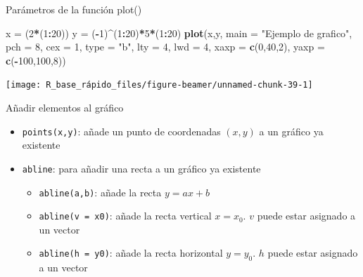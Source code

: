 \documentclass[
  ignorenonframetext,
  aspectratio=169]{beamer}
\newenvironment{Shaded}{\begin{snugshade}}{\end{snugshade}}
\newcommand{\AttributeTok}[1]{\textcolor[rgb]{0.13,0.29,0.53}{#1}}
\newcommand{\DecValTok}[1]{\textcolor[rgb]{0.00,0.00,0.81}{#1}}
\newcommand{\FunctionTok}[1]{\textcolor[rgb]{0.13,0.29,0.53}{\textbf{#1}}}
\newcommand{\NormalTok}[1]{#1}
\newcommand{\OtherTok}[1]{\textcolor[rgb]{0.56,0.35,0.01}{#1}}
\newcommand{\SpecialCharTok}[1]{\textcolor[rgb]{0.81,0.36,0.00}{\textbf{#1}}}
\newcommand{\StringTok}[1]{\textcolor[rgb]{0.31,0.60,0.02}{#1}}
\providecommand{\tightlist}{%
  \setlength{\itemsep}{0pt}\setlength{\parskip}{0pt}}
\begin{document}
\begin{frame}[fragile]{Parámetros de la función plot()}
\label{paruxe1metros-de-la-funciuxf3n-plot-3}
\begin{Shaded}
\begin{Highlighting}[]
\NormalTok{x }\OtherTok{=}\NormalTok{ (}\DecValTok{2}\SpecialCharTok{*}\NormalTok{(}\DecValTok{1}\SpecialCharTok{:}\DecValTok{20}\NormalTok{))}
\NormalTok{y }\OtherTok{=}\NormalTok{ (}\SpecialCharTok{{-}}\DecValTok{1}\NormalTok{)}\SpecialCharTok{\^{}}\NormalTok{(}\DecValTok{1}\SpecialCharTok{:}\DecValTok{20}\NormalTok{)}\SpecialCharTok{*}\DecValTok{5}\SpecialCharTok{*}\NormalTok{(}\DecValTok{1}\SpecialCharTok{:}\DecValTok{20}\NormalTok{)}
\FunctionTok{plot}\NormalTok{(x,y, }\AttributeTok{main =} \StringTok{"Ejemplo de grafico"}\NormalTok{, }\AttributeTok{pch =} \DecValTok{8}\NormalTok{, }\AttributeTok{cex =} \DecValTok{1}\NormalTok{,}
     \AttributeTok{type =} \StringTok{"b"}\NormalTok{, }\AttributeTok{lty =} \DecValTok{4}\NormalTok{, }\AttributeTok{lwd =} \DecValTok{4}\NormalTok{, }
     \AttributeTok{xaxp =} \FunctionTok{c}\NormalTok{(}\DecValTok{0}\NormalTok{,}\DecValTok{40}\NormalTok{,}\DecValTok{2}\NormalTok{), }\AttributeTok{yaxp =} \FunctionTok{c}\NormalTok{(}\SpecialCharTok{{-}}\DecValTok{100}\NormalTok{,}\DecValTok{100}\NormalTok{,}\DecValTok{8}\NormalTok{))}
\end{Highlighting}
\end{Shaded}

\begin{center}\texttt{[image: R\_base\_rápido\_files/figure-beamer/unnamed-chunk-39-1]} \end{center}
\end{frame}

\begin{frame}[fragile]{Añadir elementos al gráfico}
\label{auxf1adir-elementos-al-gruxe1fico}
\begin{itemize}
\tightlist
\item
  \texttt{points(x,y)}: añade un punto de coordenadas \((x, y)\) a un
  gráfico ya existente
\item
  \texttt{abline}: para añadir una recta a un gráfico ya existente

  \begin{itemize}
  \tightlist
  \item
    \texttt{abline(a,b)}: añade la recta \(y=ax+b\)
  \item
    \texttt{abline(v\ =\ x0)}: añade la recta vertical \(x=x_0\). \(v\)
    puede estar asignado a un vector
  \item
    \texttt{abline(h\ =\ y0)}: añade la recta horizontal \(y=y_0\).
    \(h\) puede estar asignado a un vector
  \end{itemize}
\end{itemize}
\end{frame}
\end{document}

